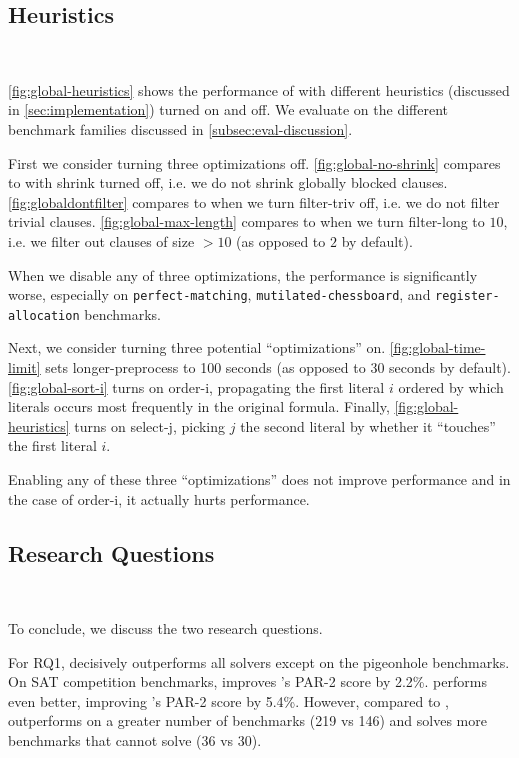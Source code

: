 \subsection{Heuristics}~\label{sec:heuristics}

\autoref{fig:global-heuristics} shows the performance of \tool with different
heuristics (discussed in \autoref{sec:implementation}) turned on and off. We
evaluate on the different benchmark families discussed in
\autoref{subsec:eval-discussion}.

First we consider turning three optimizations off.
\autoref{fig:global-no-shrink} compares \cadical to \cadical with
\textsf{shrink} turned off, i.e. we do not shrink globally blocked clauses.
\autoref{fig:globaldontfilter} compares \cadical to when we turn
\textsf{filter-triv} off, i.e. we do not filter trivial clauses.
\autoref{fig:global-max-length} compares \cadical to when we turn
\textsf{filter-long} to $10$, i.e. we filter out clauses of size $> 10$ (as
opposed to $2$ by default).

When we disable any of three optimizations, the performance is significantly
worse, especially on \texttt{perfect-matching}, \texttt{mutilated-chessboard},
and \texttt{register-allocation} benchmarks.

Next, we consider turning three potential ``optimizations'' on.
\autoref{fig:global-time-limit} sets \textsf{longer-preprocess} to 100 seconds
(as opposed to 30 seconds by default). \autoref{fig:global-sort-i} turns on
\textsf{order-i}, propagating the first literal $i$ ordered by which literals
occurs most frequently in the original formula. Finally,
\autoref{fig:global-heuristics} turns on \textsf{select-j}, picking $j$ the
second literal by whether it ``touches'' the first literal $i$.

Enabling any of these three ``optimizations'' does not improve performance and
in the case of \textsf{order-i}, it actually hurts performance.

\subsection{Research Questions}~\label{subsec:researchquestions}

To conclude, we discuss the two research questions. 

For RQ1, \tool decisively outperforms all solvers except \sadical on the
pigeonhole benchmarks. On SAT competition benchmarks, \tool improves \cadical's
PAR-2 score by 2.2\%. \prelearn performs even better, improving \cadical's PAR-2
score by 5.4\%. However, compared to \prelearn, \tool outperforms \cadical on a
greater number of benchmarks (219 vs 146) and solves more benchmarks that
\cadical cannot solve (36 vs 30).
 
